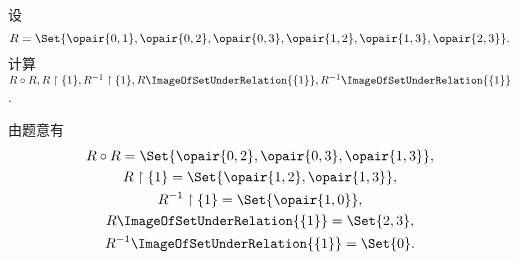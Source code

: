 \begin{example}
设\[
	R = \Set{
		\opair{0,1},
		\opair{0,2},
		\opair{0,3},
		\opair{1,2},
		\opair{1,3},
		\opair{2,3}
	}.
\]
计算\(R \circ R,
R \SetRestrict \{1\},
R^{-1} \SetRestrict \{1\},
R\ImageOfSetUnderRelation{\{1\}},
R^{-1}\ImageOfSetUnderRelation{\{1\}}\).
\begin{solution}
由题意有\begin{gather*}
	R \circ R
	= \Set{
		\opair{0,2},
		\opair{0,3},
		\opair{1,3}
	}, \\
	R \SetRestrict \{1\}
	= \Set{
		\opair{1,2},
		\opair{1,3}
	}, \\
	R^{-1} \SetRestrict \{1\}
	= \Set{
		\opair{1,0}
	}, \\
	R\ImageOfSetUnderRelation{\{1\}}
	= \Set{
		2,
		3
	}, \\
	R^{-1}\ImageOfSetUnderRelation{\{1\}}
	= \Set{
		0
	}.
\end{gather*}
\end{solution}
\end{example}

